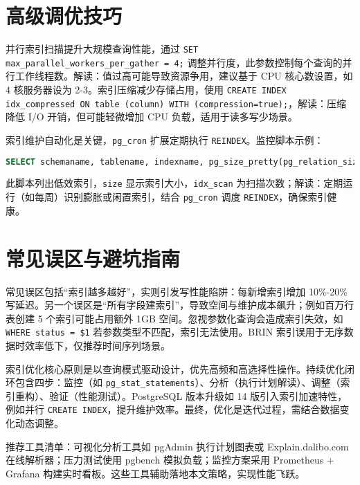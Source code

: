 \chapter{高级调优技巧}
并行索引扫描提升大规模查询性能，通过 \texttt{SET max\_{}parallel\_{}workers\_{}per\_{}gather = 4;} 调整并行度，此参数控制每个查询的并行工作线程数。解读：值过高可能导致资源争用，建议基于 CPU 核心数设置，如 4 核服务器设为 2-3。索引压缩减少存储占用，使用 \texttt{CREATE INDEX idx\_{}compressed ON table (column) WITH (compression=true);}，解读：压缩降低 I/O 开销，但可能轻微增加 CPU 负载，适用于读多写少场景。\par
索引维护自动化是关键，\texttt{pg\_{}cron} 扩展定期执行 \texttt{REINDEX}。监控脚本示例：\par
\begin{lstlisting}[language=sql]
SELECT schemaname, tablename, indexname, pg_size_pretty(pg_relation_size(indexname::regclass)) AS size, idx_scan FROM pg_stat_all_indexes WHERE idx_scan < 10;
\end{lstlisting}
此脚本列出低效索引，\texttt{size} 显示索引大小，\texttt{idx\_{}scan} 为扫描次数；解读：定期运行（如每周）识别膨胀或闲置索引，结合 \texttt{pg\_{}cron} 调度 \texttt{REINDEX}，确保索引健康。\par
\chapter{常见误区与避坑指南}
常见误区包括“索引越多越好”，实则引发写性能陷阱：每新增索引增加 10\%{}-20\%{} 写延迟。另一个误区是“所有字段建索引”，导致空间与维护成本飙升；例如百万行表创建 5 个索引可能占用额外 1GB 空间。忽视参数化查询会造成索引失效，如 \texttt{WHERE status = \${}1} 若参数类型不匹配，索引无法使用。BRIN 索引误用于无序数据时效率低下，仅推荐时间序列场景。\par
索引优化核心原则是以查询模式驱动设计，优先高频和高选择性操作。持续优化闭环包含四步：监控（如 \texttt{pg\_{}stat\_{}statements}）、分析（执行计划解读）、调整（索引重构）、验证（性能测试）。PostgreSQL 版本升级如 14 版引入索引加速特性，例如并行 \texttt{CREATE INDEX}，提升维护效率。最终，优化是迭代过程，需结合数据变化动态调整。\par
推荐工具清单：可视化分析工具如 pgAdmin 执行计划图表或 Explain.dalibo.com 在线解析器；压力测试使用 pgbench 模拟负载；监控方案采用 Prometheus + Grafana 构建实时看板。这些工具辅助落地本文策略，实现性能飞跃。\par
